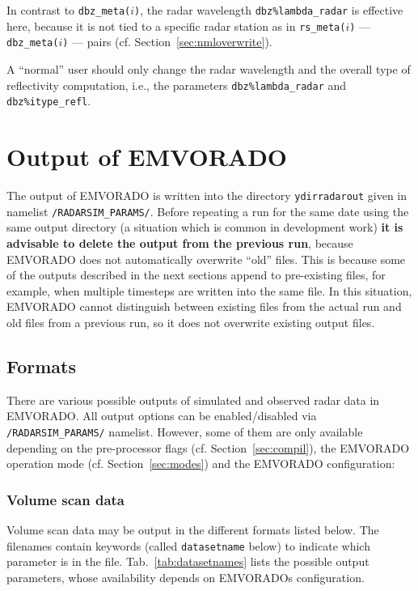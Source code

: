 \documentclass[10pt,a4paper,twoside,headinclude,footinclude,parskip=half]{scrartcl}
\newcommand{\myaktuellesection}{sec:intro}%
\newcommand{\labelsec}[1]{\label{#1}\renewcommand{\myaktuellesection}{#1}}%
\newcommand{\labelsec}[1]{\label{#1}}%
\newcommand{\srcform}[1]{\mbox{\texttt{#1}}\xspace}%
\begin{document}
In contrast to \srcform{dbz_meta($i$)}, the radar wavelength \srcform{dbz\%lambda_radar} is effective here, because it is
not tied to a specific radar station as in \srcform{rs_meta($i$)} --- \srcform{dbz_meta($i$)} --- pairs (cf. Section~\ref{sec:nmloverwrite}).

A ``normal'' user should only change the radar wavelength and the overall type of reflectivity computation, i.e., the parameters \srcform{dbz\%lambda_radar} and \srcform{dbz\%itype_refl}.


\newpage




\section{Output of EMVORADO}
\labelsec{sec:output}

The output of EMVORADO is written into the directory \srcform{ydirradarout} given in namelist \srcform{/RADARSIM_PARAMS/}. Before repeating a run for the same date using the same output directory (a situation which is common in development work) \textbf{it is advisable to delete the output from the previous run}, because EMVORADO does not automatically overwrite ``old'' files.
This is because some of the outputs described in the next sections append to pre-existing files, for example, when multiple timesteps are written into the same file.
In this situation, EMVORADO cannot distinguish between existing files from the actual run and old files from a previous run, so it does not overwrite existing output files.

\subsection{Formats}
\labelsec{sec:output:format}

There are various possible outputs of simulated and observed radar data
in EMVORADO. All output options can be enabled/disabled via \srcform{/RADARSIM_PARAMS/} namelist. However, some 
of them are only available depending on the pre-processor flags (cf. Section~\ref{sec:compil}),
the EMVORADO operation mode (cf. Section~\ref{sec:modes}) and the EMVORADO configuration:

\subsubsection{Volume scan data}
\labelsec{sec:output:format:vol}

Volume scan data may be output in the different formats listed below. The filenames
contain keywords (called \srcform{datasetname} below) to indicate which parameter is in the file. Tab.~\ref{tab:datasetnames} lists the possible output parameters, whose availability
depends on EMVORADOs configuration.
\end{document}
